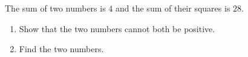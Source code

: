 The sum of two numbers is $4$ and the sum of their squares is $28$.
\begin{enumerate}
\item[(a)] Show that the two numbers cannot both be positive.
\item[(b)] Find the two numbers.
\end{enumerate}
